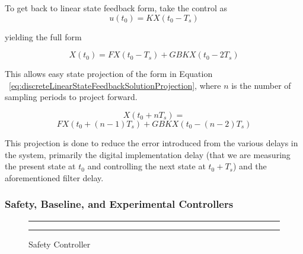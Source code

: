 \documentclass[conference]{IEEEtran}
\begin{document}
To get back to linear state feedback form, take the control as 
\begin{equation}
u\left(t_0\right)=KX\left(t_0-T_s\right)
\label{discreteLinearStateFeedbackSolutionu}
\end{equation}

yielding the full form

\begin{equation}
X\left(t_0\right)=FX\left(t_0-T_s\right)+GBKX\left(t_0-2T_s\right)
\label{eq:discreteLinearStateFeedbackSolution}
\end{equation}

This allows easy state projection of the form in Equation ~\ref{eq:discreteLinearStateFeedbackSolutionProjection}, where $n$ is the number of sampling periods to project forward.

\begin{equation}
  X\left(t_0+nT_s\right)=
	\label{eq:discreteLinearStateFeedbackSolutionProjection}
\end{equation}
\begin{equation*}
  FX\left(t_0+\left(n-1\right)T_s\right)+GBKX\left(t_0-\left(n-2\right)T_s\right) 
\end{equation*}


This projection is done to reduce the error introduced from the various delays in the system, primarily the digital implementation delay (that we are measuring the present state at $t_0$ and controlling the next state at $t_0+T_s$) and the aforementioned filter delay.

\subsubsection{Safety, Baseline, and Experimental Controllers}

\begin{figure}[h!]
\centering
  \hrule
  {}
  \hrule
  \caption{Safety Controller}
  \label{fig:safetyController}
\end{figure}
\end{document}
